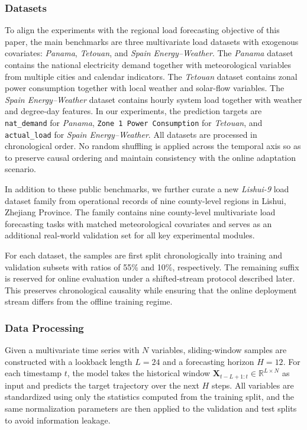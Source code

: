 ﻿\documentclass[journal]{IEEEtran}
\begin{document}
\subsubsection{Datasets}
To align the experiments with the regional load forecasting objective of this paper, the main benchmarks are three multivariate load datasets with exogenous covariates: \textit{Panama}, \textit{Tetouan}, and \textit{Spain Energy--Weather}. The \textit{Panama} dataset contains the national electricity demand together with meteorological variables from multiple cities and calendar indicators. The \textit{Tetouan} dataset contains zonal power consumption together with local weather and solar-flow variables. The \textit{Spain Energy--Weather} dataset contains hourly system load together with weather and degree-day features. In our experiments, the prediction targets are \texttt{nat\_demand} for \textit{Panama}, \texttt{Zone 1 Power Consumption} for \textit{Tetouan}, and \texttt{actual\_load} for \textit{Spain Energy--Weather}. All datasets are processed in chronological order. No random shuffling is applied across the temporal axis so as to preserve causal ordering and maintain consistency with the online adaptation scenario.

In addition to these public benchmarks, we further curate a new \textit{Lishui-9} load dataset family from operational records of nine county-level regions in Lishui, Zhejiang Province. The family contains nine county-level multivariate load forecasting tasks with matched meteorological covariates and serves as an additional real-world validation set for all key experimental modules.

For each dataset, the samples are first split chronologically into training and validation subsets with ratios of 55\% and 10\%, respectively. The remaining suffix is reserved for online evaluation under a shifted-stream protocol described later. This preserves chronological causality while ensuring that the online deployment stream differs from the offline training regime.

\subsubsection{Data Processing}
Given a multivariate time series with $N$ variables, sliding-window samples are constructed with a lookback length $L=24$ and a forecasting horizon $H=12$. For each timestamp $t$, the model takes the historical window $\mathbf{X}_{t-L+1:t}\in\mathbb{R}^{L\times N}$ as input and predicts the target trajectory over the next $H$ steps. All variables are standardized using only the statistics computed from the training split, and the same normalization parameters are then applied to the validation and test splits to avoid information leakage.
\end{document}
